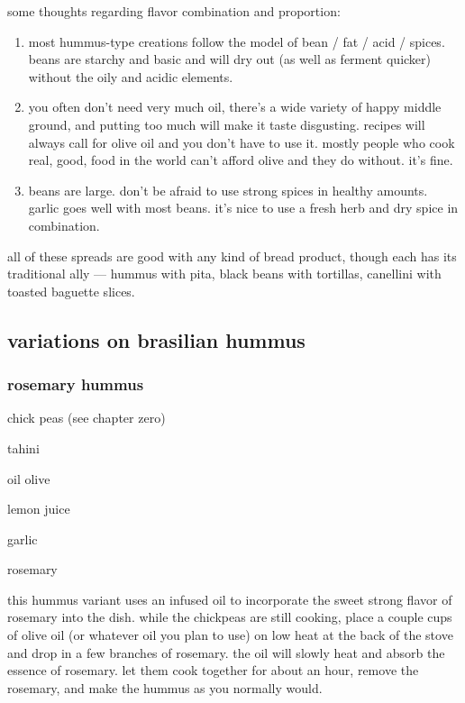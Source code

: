 some thoughts regarding flavor combination and proportion:

\begin{enumerate}
  \item most hummus-type creations follow the model of bean / fat /
  acid / spices. beans are starchy and basic and will dry out (as well
  as ferment quicker) without the oily and acidic elements.

  \item you often don't need very much oil, there's a wide
  variety of happy middle ground, and putting too much will make it
  taste disgusting. recipes will always call for olive oil and you
  don't have to use it. mostly people who cook real, good, food in
  the world can't afford olive and they do without. it's fine.

  \item beans are large. don't be afraid to use strong spices in
  healthy amounts. garlic goes well with most beans. it's nice to
  use a fresh herb and dry spice in combination.
\end{enumerate}

all of these spreads are good with any kind of bread product, though
each has its traditional ally --- hummus with pita, black beans with
tortillas, canellini with toasted baguette slices.

\subsection{variations on brasilian hummus}

\subsubsection{rosemary hummus}

\begin{ingredients}
  \item chick peas (see chapter zero)
  \item tahini
  \item oil olive
  \item lemon juice
  \item garlic
  \item rosemary
\end{ingredients}

this hummus variant uses an infused oil to incorporate the sweet
strong flavor of rosemary into the dish. while the chickpeas are still
cooking, place a couple cups of olive oil (or whatever oil you plan to
use) on low heat at the back of the stove and drop in a few branches
of rosemary. the oil will slowly heat and absorb the essence of
rosemary. let them cook together for about an hour, remove the
rosemary, and make the hummus as you normally would.

